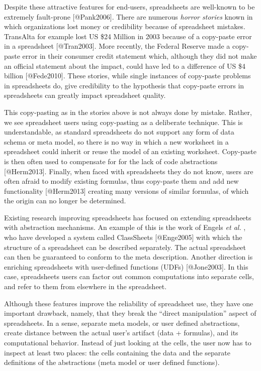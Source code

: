 \documentclass[11pt,]{article}
\begin{document}
Despite these attractive features for end-users, spreadsheets are
well-known to be extremely fault-prone {[}@Pank2006{]}. There are
numerous \emph{horror stories} known in which organizations lost money
or credibility because of spreadsheet mistakes. TransAlta for example
lost US \$24 Million in 2003 because of a copy-paste error in a
spreadsheet {[}@Tran2003{]}. More recently, the Federal Reserve made a
copy-paste error in their consumer credit statement which, although they
did not make an official statement about the impact, could have led to a
difference of US \$4 billion {[}@Fede2010{]}. These stories, while
single instances of copy-paste problems in spreadsheets do, give
credibility to the hypothesis that copy-paste errors in spreadsheets can
greatly impact spreadsheet quality.

This copy-pasting as in the stories above is not always done by mistake.
Rather, we see spreadsheet users using copy-pasting as a deliberate
technique. This is understandable, as standard spreadsheets do not
support any form of data schema or meta model, so there is no way in
which a new worksheet in a spreadsheet could inherit or reuse the model
of an existing worksheet. Copy-paste is then often used to compensate
for for the lack of code abstractions {[}@Herm2013{]}. Finally, when
faced with spreadsheets they do not know, users are often afraid to
modify existing formulas, thus copy-paste them and add new functionality
{[}@Herm2013{]} creating many versions of similar formulas, of which the
origin can no longer be determined.

Existing research improving spreadsheets has focused on extending
spreadsheets with abstraction mechanisms. An example of this is the work
of Engels \emph{et al.} , who have developed a system called ClassSheets
{[}@Enge2005{]} with which the structure of a spreadsheet can be
described separately. The actual spreadsheet can then be guaranteed to
conform to the meta description. Another direction is enriching
spreadsheets with user-defined functions (UDFs) {[}@Jone2003{]}. In this
case, spreadsheets users can factor out common computations into
separate cells, and refer to them from elsewhere in the spreadsheet.

Although these features improve the reliability of spreadsheet use, they
have one important drawback, namely, that they break the ``direct
manipulation'' aspect of spreadsheets. In a sense, separate meta models,
or user defined abstractions, create distance between the actual user's
artifact (data + formulas), and its computational behavior. Instead of
just looking at the cells, the user now has to inspect at least two
places: the cells containing the data and the separate definitions of
the abstractions (meta model or user defined functions).
\end{document}
